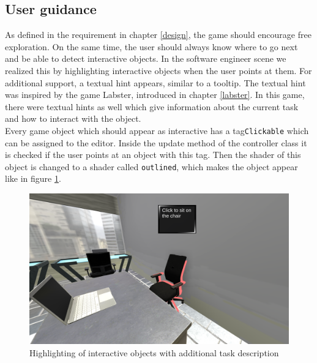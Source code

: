 \subsection{User guidance}
As defined in the requirement in chapter \ref{design}, the game should encourage free exploration. On the same time, the user should always know where to go next and be able to detect interactive objects. In the software engineer scene we realized this by highlighting interactive objects when the user points at them. For additional support, a textual hint appears, similar to a tooltip. The textual hint was inspired by the game Labster, introduced in chapter \ref{labster}. In this game, there were textual hints as well which give information about the current task and how to interact with the object.\\
Every game object which should appear as interactive has a tag\texttt{Clickable} which can be assigned to the editor. Inside the update method of the controller class it is checked if the user points at an object with this tag. Then the shader of this object is changed to a shader called \texttt{outlined}, which makes the object appear like in figure \ref{fig:user-hints}.
\begin{figure}[h!]
  \includegraphics[width=13cm]{kapitel/user-hint-screenshot.PNG}
  \centering
  \caption{Highlighting of interactive objects with additional task description}
  \label{fig:user-hints}
\end{figure}

